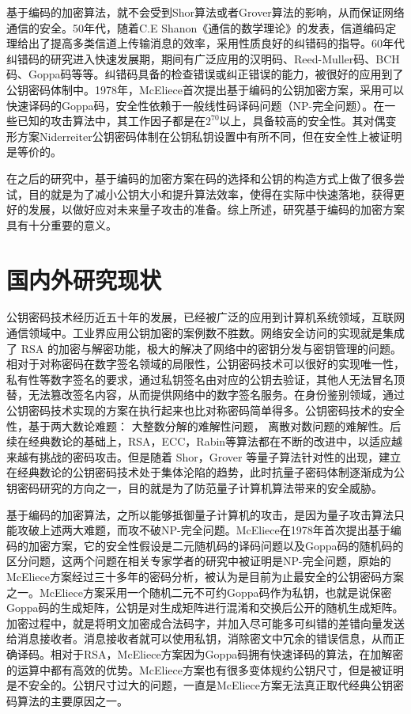 基于编码的加密算法，就不会受到Shor算法或者Grover算法的影响，从而保证网络通信的安全\cite{Overbeck2009Code}。50年代，随着C.E Shanon《通信的数学理论》的发表，信道编码定理给出了提高多类信道上传输消息的效率，采用性质良好的纠错码的指导。60年代纠错码的研究进入快速发展期，期间有广泛应用的汉明码、Reed-Muller码\cite{Karpunin2004On}、BCH码\cite{Faug2016Structural}、Goppa码\cite{Macwilliams1977The}等等。纠错码具备的检查错误或纠正错误的能力，被很好的应用到了公钥密码体制中。1978年，McEliece首次提出基于编码的公钥加密方案，采用可以快速译码的Goppa码，安全性依赖于一般线性码译码问题（NP-完全问题）。在一些已知的攻击算法中，其工作因子都是在$2 ^ {70}$以上，具备较高的安全性。其对偶变形方案Niderreiter公钥密码体制在公钥私钥设置中有所不同，但在安全性上被证明是等价的。

在之后的研究中，基于编码的加密方案在码的选择和公钥的构造方式上做了很多尝试，目的就是为了减小公钥大小和提升算法效率，使得在实际中快速落地，获得更好的发展，以做好应对未来量子攻击的准备。综上所述，研究基于编码的加密方案具有十分重要的意义。

\section{国内外研究现状}
公钥密码技术经历近五十年的发展，已经被广泛的应用到计算机系统领域，互联网通信领域中\cite{郑东2013密码学综述}。工业界应用公钥加密的案例数不胜数。网络安全访问的实现就是集成了 RSA 的加密与解密功能，极大的解决了网络中的密钥分发与密钥管理的问题。相对于对称密码在数字签名领域的局限性，公钥密码技术可以很好的实现唯一性，私有性等数字签名的要求，通过私钥签名由对应的公钥去验证，其他人无法冒名顶替，无法篡改签名内容，从而提供网络中的数字签名服务。在身份鉴别领域，通过公钥密码技术实现的方案在执行起来也比对称密码简单得多。公钥密码技术的安全性，基于两大数论难题： 大整数分解的难解性问题， 离散对数问题的难解性。后续在经典数论的基础上，RSA，ECC，Rabin等算法都在不断的改进中，以适应越来越有挑战的密码攻击。但是随着 Shor，Grover 等量子算法针对性的出现，建立在经典数论的公钥密码技术处于集体沦陷的趋势，此时抗量子密码体制逐渐成为公钥密码研究的方向之一，目的就是为了防范量子计算机算法带来的安全威胁。

基于编码的加密算法，之所以能够抵御量子计算机的攻击，是因为量子攻击算法只能攻破上述两大难题，而攻不破{NP-}完全问题。McEliece在1978年首次提出基于编码的加密方案，它的安全性假设是二元随机码的译码问题\cite{Berlekamp1978On}以及Goppa码的随机码的区分问题\cite{Engelbert2007A}，这两个问题在相关专家学者的研究中被证明是{NP-}完全问题，原始的McEliece方案经过三十多年的密码分析，被认为是目前为止最安全的公钥密码方案之一。McEliece方案采用一个随机二元不可约Goppa码作为私钥，也就是说保密Goppa码的生成矩阵，公钥是对生成矩阵进行混淆和交换后公开的随机生成矩阵。加密过程中，就是将明文加密成合法码字，并加入尽可能多可纠错的差错向量发送给消息接收者。消息接收者就可以使用私钥，消除密文中冗余的错误信息，从而正确译码。相对于RSA，McEliece方案因为Goppa码拥有快速译码的算法，在加解密的运算中都有高效的优势。McEliece方案也有很多变体规约公钥尺寸，但是被证明是不安全的\cite{Landais2013An, Bernstein2008Attacking}。公钥尺寸过大的问题，一直是McEliece方案无法真正取代经典公钥密码算法的主要原因之一。

